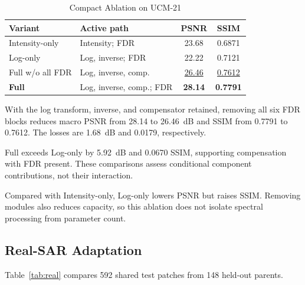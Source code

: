 \documentclass[journal]{IEEEtran}
\begin{document}
\begin{table}[!t]
\caption{Compact Ablation on UCM-21}
\label{tab:ablation}
\centering
\footnotesize
\setlength{\tabcolsep}{2.7pt}
\renewcommand{\arraystretch}{1.08}
\begin{tabularx}{\columnwidth}{@{}lXcc@{}}
\toprule
\textbf{Variant} & \textbf{Active path} & \textbf{PSNR} & \textbf{SSIM} \\
\midrule
Intensity-only & Intensity; FDR & 23.68 & 0.6871 \\
Log-only & Log, inverse; FDR & 22.22 & 0.7121 \\
Full w/o all FDR & Log, inverse, comp. & \underline{26.46} & \underline{0.7612} \\
\textbf{Full} & Log, inverse, comp.; FDR & \textbf{28.14} & \textbf{0.7791} \\
\bottomrule
\end{tabularx}
\end{table}

With the log transform, inverse, and compensator retained, removing all six FDR blocks reduces macro PSNR from 28.14 to 26.46~dB and SSIM from 0.7791 to 0.7612. The losses are 1.68~dB and 0.0179, respectively.

Full exceeds Log-only by 5.92~dB and 0.0670 SSIM, supporting compensation with FDR present. These comparisons assess conditional component contributions, not their interaction.

Compared with Intensity-only, Log-only lowers PSNR but raises SSIM. Removing modules also reduces capacity, so this ablation does not isolate spectral processing from parameter count.

\subsection{Real-SAR Adaptation}
Table~\ref{tab:real} compares 592 shared test patches from 148 held-out parents.
\end{document}
